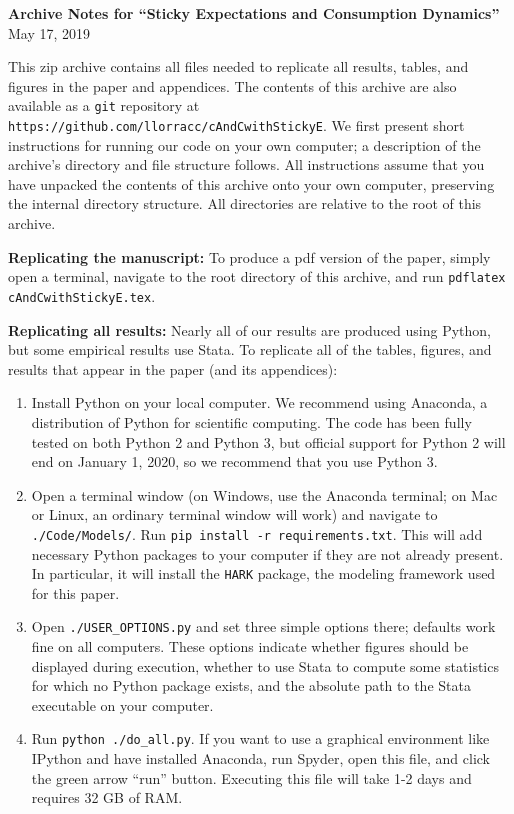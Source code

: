\documentclass[12pt,pdftex,letterpaper]{article}
\begin{document}
\begin{center}
\textbf{Archive Notes for ``Sticky Expectations and Consumption Dynamics''} \\ May 17, 2019
\end{center}

This zip archive contains all files needed to replicate all results, tables, and figures in the paper and appendices.  The contents of this archive are also available as a \texttt{git} repository at \texttt{https://github.com/llorracc/cAndCwithStickyE}.  We first present short instructions for running our code on your own computer; a description of the archive's directory and file structure follows.  All instructions assume that you have unpacked the contents of this archive onto your own computer, preserving the internal directory structure.  All directories are relative to the root of this archive.

\vspace{0.5cm}

\noindent \textbf{Replicating the manuscript:} To produce a pdf version of the paper, simply open a terminal, navigate to the root directory of this archive, and run  \texttt{pdflatex cAndCwithStickyE.tex}.

\vspace{0.5cm}

\noindent \textbf{Replicating all results:} Nearly all of our results are produced using Python, but some empirical results use Stata.  To replicate all of the tables, figures, and results that appear in the paper (and its appendices):
\begin{enumerate}
\item Install Python on your local computer.  We recommend using Anaconda, a distribution of Python for scientific computing.  The code has been fully tested on both Python 2 and Python 3, but official support for Python 2 will end on January 1, 2020, so we recommend that you use Python 3.

\item Open a terminal window (on Windows, use the Anaconda terminal; on Mac or Linux, an ordinary terminal window will work) and navigate to \texttt{./Code/Models/}.  Run \texttt{pip install -r requirements.txt}.  This will add necessary Python packages to your computer if they are not already present.  In particular, it will install the \texttt{HARK} package, the modeling framework used for this paper.

\item Open \texttt{./USER\_OPTIONS.py} and set three simple options there; defaults work fine on all computers.  These options indicate whether figures should be displayed during execution, whether to use Stata to compute some statistics for which no Python package exists, and the absolute path to the Stata executable on your computer.

\item Run \texttt{python ./do\_all.py}.  If you want to use a graphical environment like IPython and have installed Anaconda, run Spyder, open this file, and click the green arrow ``run'' button.  Executing this file will take 1-2 days and requires 32 GB of RAM.
\end{enumerate}
\end{document}
